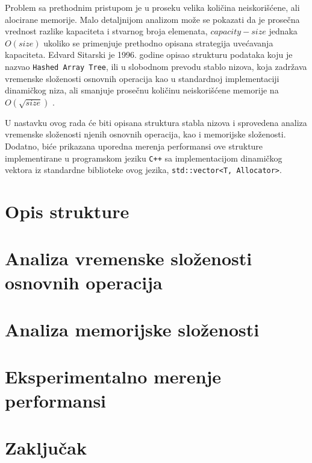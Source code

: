 \documentclass[a4paper]{article}
\begin{document}
Problem sa prethodnim pristupom je u proseku velika količina neiskorišćene, ali alocirane memorije. Malo detaljnijom analizom može se pokazati da je prosečna vrednost razlike kapaciteta i stvarnog broja elemenata, $capacity - size$ jednaka $O(size)$ ukoliko se primenjuje prethodno opisana strategija uvećavanja kapaciteta. Edvard Sitarski je 1996. godine opisao strukturu podataka koju je nazvao \verb|Hashed Array Tree|, ili u slobodnom prevodu stablo nizova, koja zadržava vremenske složenosti osnovnih operacija kao u standardnoj implementaciji dinamičkog niza, ali smanjuje prosečnu količinu neiskorišćene memorije na $O(\sqrt{size})$ \cite{hat-sitarski}.

U nastavku ovog rada će biti opisana struktura stabla nizova i sprovedena analiza vremenske složenosti njenih osnovnih operacija, kao i memorijske složenosti. Dodatno, biće prikazana uporedna merenja performansi ove strukture implementirane u programskom jeziku \verb|C++| sa implementacijom dinamičkog vektora iz standardne biblioteke ovog jezika, \verb|std::vector<T, Allocator>|.

\section{Opis strukture}

\section{Analiza vremenske složenosti osnovnih operacija}

\section{Analiza memorijske složenosti}

\section{Eksperimentalno merenje performansi}

\section{Zaključak}

\appendix
 

\end{document}

